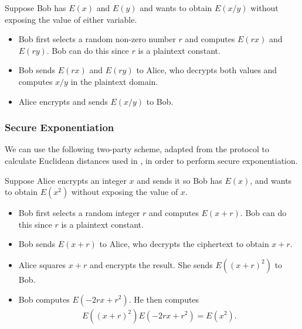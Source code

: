 Suppose Bob has $E\left(x\right)$ and $E\left(y\right)$ and wants to obtain $E\left(x/y\right)$ without exposing the value of either variable.
\begin{itemize}
	\item Bob first selects a random non-zero number $r$ and computes $E\left(rx\right)$ and $E\left(ry\right)$. Bob can do this since $r$ is a plaintext constant.
	\item Bob sends $E\left(rx\right)$ and $E\left(ry\right)$ to Alice, who decrypts both values and computes $x/y$ in the plaintext domain.
	\item Alice encrypts and sends $E\left(x/y\right)$ to Bob.
\end{itemize}

\subsubsection{Secure Exponentiation}
\label{ssec:exponentiationprotocol}
 We can use the following two-party scheme, adapted from the protocol to calculate Euclidean distances used in \cite{hutchison_privacy-preserving_2009}, in order to perform secure exponentiation.

Suppose Alice encrypts an integer $x$ and sends it so Bob has $E\left(x\right)$, and wants to obtain $E\left(x^2\right)$ without exposing the value of $x$.
\begin{itemize}
	\item Bob first selects a random integer $r$ and computes $E\left(x+r\right)$. Bob can do this since $r$ is a plaintext constant.
	\item Bob sends $E\left(x+r\right)$ to Alice, who decrypts the ciphertext to obtain $x+r$.
	\item Alice squares $x+r$ and encrypts the result. She sends $E\left(\left(x+r\right)^2\right)$ to Bob.
	\item Bob computes $E\left(-2rx + r^2\right)$. He then computes
	\begin{align*}
		E\left(\left(x+r\right)^2\right)E\left(-2rx + r^2\right) = E\left(x^2\right).
	\end{align*}
\end{itemize}

